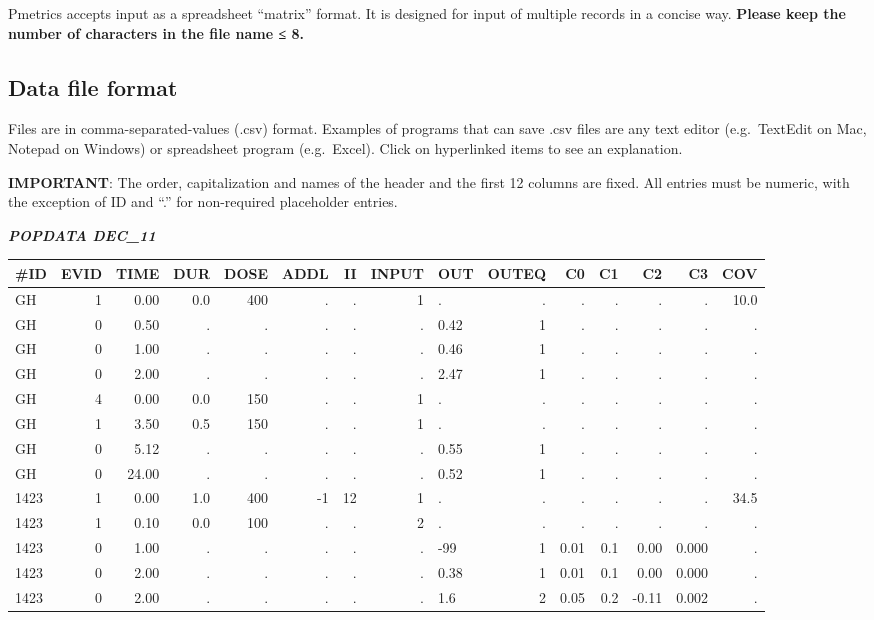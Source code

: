 \documentclass[
]{book}
\begin{document}
Pmetrics accepts input as a spreadsheet ``matrix'' format. It is designed
for input of multiple records in a concise way. \textbf{Please keep the number
of characters in the file name ≤ 8.}

\hypertarget{data-file-format}{%
\subsection{Data file format}\label{data-file-format}}

Files are in comma-separated-values (.csv) format. Examples of programs
that can save .csv files are any text editor (e.g.~TextEdit on Mac,
Notepad on Windows) or spreadsheet program (e.g.~Excel). Click on
hyperlinked items to see an explanation.

\textbf{IMPORTANT}: The order, capitalization and names of the header and the
first 12 columns are fixed. All entries must be numeric, with the
exception of ID and ``.'' for non-required placeholder entries.

\textbf{\emph{POPDATA DEC\_11}}

\begin{tabular}{l|r|r|r|r|r|r|r|l|r|r|r|r|r|r}
\hline
\#ID & EVID & TIME & DUR & DOSE & ADDL & II & INPUT & OUT & OUTEQ & C0 & C1 & C2 & C3 & COV\\
\hline
GH & 1 & 0.00 & 0.0 & 400 & . & . & 1 & . & . & . & . & . & . & 10.0\\
\hline
GH & 0 & 0.50 & . & . & . & . & . & 0.42 & 1 & . & . & . & . & .\\
\hline
GH & 0 & 1.00 & . & . & . & . & . & 0.46 & 1 & . & . & . & . & .\\
\hline
GH & 0 & 2.00 & . & . & . & . & . & 2.47 & 1 & . & . & . & . & .\\
\hline
GH & 4 & 0.00 & 0.0 & 150 & . & . & 1 & . & . & . & . & . & . & .\\
\hline
GH & 1 & 3.50 & 0.5 & 150 & . & . & 1 & . & . & . & . & . & . & .\\
\hline
GH & 0 & 5.12 & . & . & . & . & . & 0.55 & 1 & . & . & . & . & .\\
\hline
GH & 0 & 24.00 & . & . & . & . & . & 0.52 & 1 & . & . & . & . & .\\
\hline
1423 & 1 & 0.00 & 1.0 & 400 & -1 & 12 & 1 & . & . & . & . & . & . & 34.5\\
\hline
1423 & 1 & 0.10 & 0.0 & 100 & . & . & 2 & . & . & . & . & . & . & .\\
\hline
1423 & 0 & 1.00 & . & . & . & . & . & -99 & 1 & 0.01 & 0.1 & 0.00 & 0.000 & .\\
\hline
1423 & 0 & 2.00 & . & . & . & . & . & 0.38 & 1 & 0.01 & 0.1 & 0.00 & 0.000 & .\\
\hline
1423 & 0 & 2.00 & . & . & . & . & . & 1.6 & 2 & 0.05 & 0.2 & -0.11 & 0.002 & .\\
\hline
\end{tabular}
\end{document}
